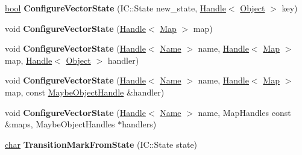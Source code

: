 \begin{DoxyCompactItemize}
\mbox{\hyperlink{classbool}{bool}} {\bfseries Configure\+Vector\+State} (I\+C\+::\+State new\+\_\+state, \mbox{\hyperlink{classv8_1_1internal_1_1Handle}{Handle}}$<$ \mbox{\hyperlink{classv8_1_1internal_1_1Object}{Object}} $>$ key)
\item 
\mbox{\label{classv8_1_1internal_1_1IC_adbea65ebb4ed2f310805fddf1026a095}} 
void {\bfseries Configure\+Vector\+State} (\mbox{\hyperlink{classv8_1_1internal_1_1Handle}{Handle}}$<$ \mbox{\hyperlink{classv8_1_1internal_1_1Map}{Map}} $>$ map)
\item 
\mbox{\label{classv8_1_1internal_1_1IC_ae95403f898bfb88cbbfb2ced662c4ad1}} 
void {\bfseries Configure\+Vector\+State} (\mbox{\hyperlink{classv8_1_1internal_1_1Handle}{Handle}}$<$ \mbox{\hyperlink{classv8_1_1internal_1_1Name}{Name}} $>$ name, \mbox{\hyperlink{classv8_1_1internal_1_1Handle}{Handle}}$<$ \mbox{\hyperlink{classv8_1_1internal_1_1Map}{Map}} $>$ map, \mbox{\hyperlink{classv8_1_1internal_1_1Handle}{Handle}}$<$ \mbox{\hyperlink{classv8_1_1internal_1_1Object}{Object}} $>$ handler)
\item 
\mbox{\label{classv8_1_1internal_1_1IC_a2a2bcd21c1fdf66e5e8a09f73e81b872}} 
void {\bfseries Configure\+Vector\+State} (\mbox{\hyperlink{classv8_1_1internal_1_1Handle}{Handle}}$<$ \mbox{\hyperlink{classv8_1_1internal_1_1Name}{Name}} $>$ name, \mbox{\hyperlink{classv8_1_1internal_1_1Handle}{Handle}}$<$ \mbox{\hyperlink{classv8_1_1internal_1_1Map}{Map}} $>$ map, const \mbox{\hyperlink{classv8_1_1internal_1_1MaybeObjectHandle}{Maybe\+Object\+Handle}} \&handler)
\item 
\mbox{\label{classv8_1_1internal_1_1IC_ad511d9161f189dc5d3b6aceb35d92007}} 
void {\bfseries Configure\+Vector\+State} (\mbox{\hyperlink{classv8_1_1internal_1_1Handle}{Handle}}$<$ \mbox{\hyperlink{classv8_1_1internal_1_1Name}{Name}} $>$ name, Map\+Handles const \&maps, Maybe\+Object\+Handles $\ast$handlers)
\item 
\mbox{\label{classv8_1_1internal_1_1IC_ac4072f911634765d5b5777c71b9dd68a}} 
\mbox{\hyperlink{classchar}{char}} {\bfseries Transition\+Mark\+From\+State} (I\+C\+::\+State state)
\item 
\mbox{\label{classv8_1_1internal_1_1IC_af37837a5140c88c3179a970e690e091e}} 

\end{DoxyCompactItemize}
